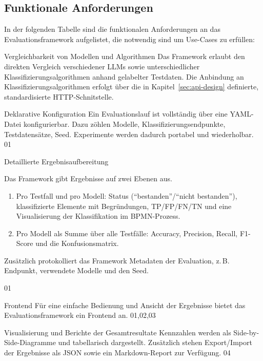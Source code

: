 \subsection*{Funktionale Anforderungen}

In der folgenden Tabelle sind die funktionalen Anforderungen an das Evaluationsframework aufgelistet, die notwendig sind um Use-Cases zu erfüllen:

\begin{center}
    {Vergleichbarkeit von Modellen und Algorithmen}
    {Das Framework erlaubt den direkten Vergleich verschiedener \acp{LLM} sowie unterschiedlicher Klassifizierungsalgorithmen anhand gelabelter Testdaten. Die Anbindung an Klassifizierungsalgorithmen erfolgt über die in Kapitel~\ref{sec:api-design} definierte, standardisierte HTTP-Schnitstelle.}
    {}
\end{center}

\begin{center}
    {Deklarative Konfiguration}
    {Ein Evaluationslauf ist vollständig über eine YAML-Datei konfigurierbar. Dazu zöhlen Modelle, Klassifizierungsendpunkte, Testdatensätze, Seed. Experimente werden dadurch portabel und wiederholbar.}
    {01}
\end{center}

\begin{center}
    {Detaillierte Ergebnisaufbereitung}
    {
    Das Framework gibt Ergebnisse auf zwei Ebenen aus.
    \begin{enumerate}
        \item Pro Testfall und pro Modell: Status (\enquote{bestanden}/\enquote{nicht bestanden}), klassifizierte Elemente mit Begründungen, \ac{TP}/\ac{FP}/\ac{FN}/\ac{TN} und eine Visualisierung der Klassifikation im \ac{BPMN}-Prozess.
        \item Pro Modell als Summe über alle Testfälle: Accuracy, Precision, Recall, F1-Score und die Konfusionsmatrix.
    \end{enumerate}
    Zusätzlich protokolliert das Framework Metadaten der Evaluation, z.\,B. Endpunkt, verwendete Modelle und den Seed.
    }
    {01}
\end{center}

\begin{center}
    {Frontend}
    {Für eine einfache Bedienung und Ansicht der Ergebnisse bietet das Evaluationsframework ein Frontend an.}
    {01,02,03}
\end{center}

\begin{center}
    {Visualisierung und Berichte der Gesamtresultate}
    {Kennzahlen werden als Side-by-Side-Diagramme und tabellarisch dargestellt. Zusätzlich stehen Export/Import der Ergebnisse als JSON sowie ein Markdown-Report zur Verfügung.}
    {04}
\end{center}